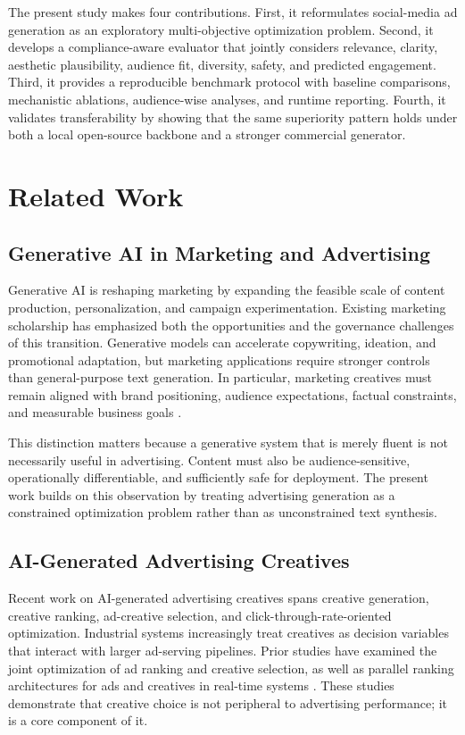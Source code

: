 \documentclass[applsci,article,submit,pdftex,moreauthors]{Definitions/mdpi}
\begin{document}
The present study makes four contributions. First, it reformulates social-media ad generation as an exploratory multi-objective optimization problem. Second, it develops a compliance-aware evaluator that jointly considers relevance, clarity, aesthetic plausibility, audience fit, diversity, safety, and predicted engagement. Third, it provides a reproducible benchmark protocol with baseline comparisons, mechanistic ablations, audience-wise analyses, and runtime reporting. Fourth, it validates transferability by showing that the same superiority pattern holds under both a local open-source backbone and a stronger commercial generator.

\section{Related Work}

\subsection{Generative AI in Marketing and Advertising}

Generative AI is reshaping marketing by expanding the feasible scale of content production, personalization, and campaign experimentation. Existing marketing scholarship has emphasized both the opportunities and the governance challenges of this transition. Generative models can accelerate copywriting, ideation, and promotional adaptation, but marketing applications require stronger controls than general-purpose text generation. In particular, marketing creatives must remain aligned with brand positioning, audience expectations, factual constraints, and measurable business goals \cite{grewal2025,heitmann2024}.

This distinction matters because a generative system that is merely fluent is not necessarily useful in advertising. Content must also be audience-sensitive, operationally differentiable, and sufficiently safe for deployment. The present work builds on this observation by treating advertising generation as a constrained optimization problem rather than as unconstrained text synthesis.

\subsection{AI-Generated Advertising Creatives}

Recent work on AI-generated advertising creatives spans creative generation, creative ranking, ad-creative selection, and click-through-rate-oriented optimization. Industrial systems increasingly treat creatives as decision variables that interact with larger ad-serving pipelines. Prior studies have examined the joint optimization of ad ranking and creative selection, as well as parallel ranking architectures for ads and creatives in real-time systems \cite{lin2022,yang2024aaai}. These studies demonstrate that creative choice is not peripheral to advertising performance; it is a core component of it.
\end{document}
